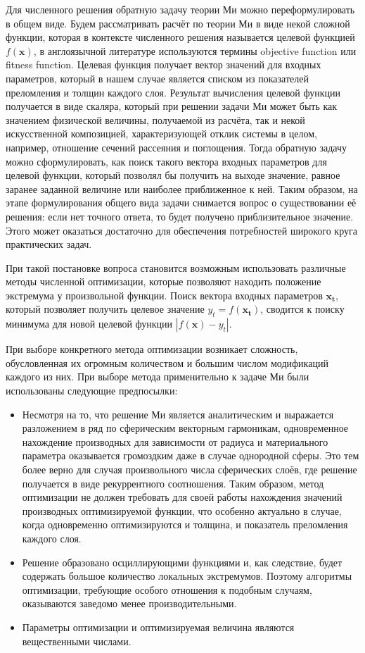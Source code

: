Для численного решения обратную задачу теории Ми можно
переформулировать в общем виде. Будем рассматривать расчёт по теории
Ми в виде некой сложной функции, которая в контексте численного
решения называется целевой функцией $f(\mathbf{x})$, в англоязычной
литературе используются термины objective function или fitness
function.  Целевая функция получает вектор значений для входных
параметров, который в нашем случае является списком из показателей
преломления и толщин каждого слоя. Результат вычисления целевой
функции получается в виде скаляра, который при решении задачи Ми может
быть как значением физической величины, получаемой из расчёта, так и
некой искусственной композицией, характеризующей отклик системы в
целом, например, отношение сечений рассеяния и поглощения. Тогда
обратную задачу можно сформулировать, как поиск такого вектора входных
параметров для целевой функции, который позволял бы получить на выходе
значение, равное заранее заданной величине или наиболее приближенное к
ней. Таким образом, на этапе формулирования общего вида задачи
снимается вопрос о существовании её решения: если нет точного ответа,
то будет получено приблизительное значение. Этого может оказаться
достаточно для обеспечения потребностей широкого круга практических
задач.

При такой постановке вопроса становится возможным использовать
различные методы численной оптимизации, которые позволяют находить
положение экстремума у произвольной функции. Поиск вектора входных
параметров $\mathbf{x_t}$, который позволяет получить целевое значение
$y_t=f(\mathbf{x_t})$, сводится к поиску минимума для новой целевой
функции $\left|f(\mathbf{x})-y_t\right|$.

При выборе конкретного метода оптимизации возникает сложность,
обусловленная их огромным количеством и большим числом
модификаций каждого из них. При выборе метода применительно к задаче
Ми были использованы следующие предпосылки:
\begin{itemize}
\item \label{ref:why-jade} Несмотря на то, что решение Ми является аналитическим и
  выражается разложением в ряд по сферическим векторным
  гармоникам, одновременное нахождение производных для зависимости от
  радиуса и материального параметра оказывается громоздким даже в
  случае однородной сферы. Это тем более верно для случая
  произвольного числа сферических слоёв, где решение получается в виде
  рекуррентного соотношения.  Таким образом, метод оптимизации не
  должен требовать для своей работы нахождения значений производных
  оптимизируемой функции, что особенно актуально в случае, когда
  одновременно оптимизируются и толщина, и показатель преломления
  каждого слоя.
\item Решение образовано осциллирующими функциями и, как следствие,
  будет содержать большое количество локальных экстремумов. Поэтому
  алгоритмы оптимизации, требующие особого отношения к подобным
  случаям, оказываются заведомо менее производительными.
\item Параметры оптимизации и оптимизируемая величина являются
  вещественными числами.
\end{itemize}

